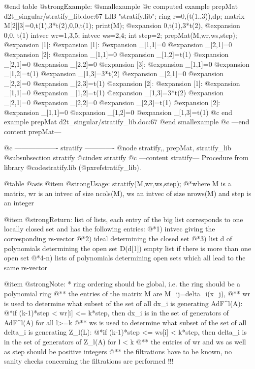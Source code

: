 @end table
@strong{Example:}
@smallexample
@c computed example prepMat d2t_singular/stratify_lib.doc:67 
LIB "stratify.lib";
ring r=0,(t(1..3)),dp;
matrix M[2][3]=0,t(1),3*t(2),0,0,t(1);
print(M);
@expansion{} 0,t(1),3*t(2),
@expansion{} 0,0,   t(1)   
intvec wr=1,3,5;
intvec ws=2,4;
int step=2;
prepMat(M,wr,ws,step);
@expansion{} [1]:
@expansion{}    [1]:
@expansion{}       _[1,1]=0
@expansion{}       _[2,1]=0
@expansion{}    [2]:
@expansion{}       _[1,1]=0
@expansion{}       _[1,2]=t(1)
@expansion{}       _[2,1]=0
@expansion{}       _[2,2]=0
@expansion{}    [3]:
@expansion{}       _[1,1]=0
@expansion{}       _[1,2]=t(1)
@expansion{}       _[1,3]=3*t(2)
@expansion{}       _[2,1]=0
@expansion{}       _[2,2]=0
@expansion{}       _[2,3]=t(1)
@expansion{} [2]:
@expansion{}    [1]:
@expansion{}       _[1,1]=0
@expansion{}       _[1,2]=t(1)
@expansion{}       _[1,3]=3*t(2)
@expansion{}       _[2,1]=0
@expansion{}       _[2,2]=0
@expansion{}       _[2,3]=t(1)
@expansion{}    [2]:
@expansion{}       _[1,1]=0
@expansion{}       _[1,2]=0
@expansion{}       _[1,3]=t(1)
@c end example prepMat d2t_singular/stratify_lib.doc:67
@end smallexample
@c ---end content prepMat---

@c ------------------- stratify -------------
@node stratify,, prepMat, stratify_lib
@subsubsection stratify
@cindex stratify
@c ---content stratify---
Procedure from library @code{stratify.lib} (@pxref{stratify_lib}).

@table @asis
@item @strong{Usage:}
stratify(M,wr,ws,step);
@*where M is a matrix, wr is an intvec of size ncols(M),
ws an intvec of size nrows(M) and step is an integer

@item @strong{Return:}
list of lists, each entry of the big list corresponds to one
locally closed set and has the following entries:
@*1) intvec giving the corresponding rs-vector
@*2) ideal determining the closed set
@*3) list d of polynomials determining the open set D(d[1])
empty list if there is more than one open set
@*4-n) lists of polynomials determining open sets which all lead
to the same rs-vector

@item @strong{Note:}
* ring ordering should be global, i.e. the ring should be a
polynomial ring
@** the entries of the matrix M are M_ij=delta_i(x_j),
@** wr is used to determine what subset of the set of all dx_i is
generating AdF^l(A):
@*if (k-1)*step < wr[i] <= k*step, then dx_i is in the set of
generators of AdF^l(A) for all l>=k
@** ws is used to determine what subset of the set of all delta_i
is generating Z_l(L):
@*if (k-1)*step <= ws[i] < k*step, then delta_i is in the set
of generators of Z_l(A) for l < k
@** the entries of wr and ws as well as step should be positive
integers
@** the filtrations have to be known, no sanity checks concerning
the filtrations are performed !!!

